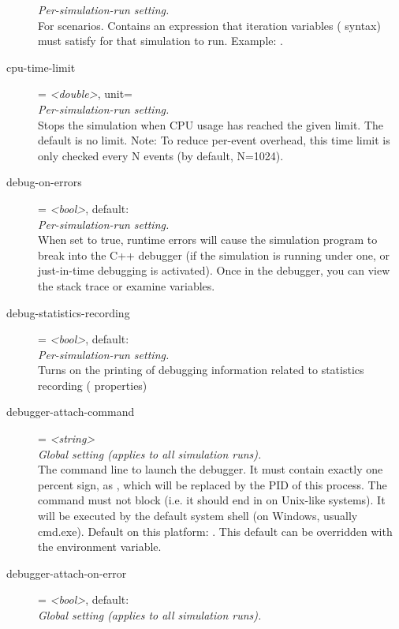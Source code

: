\begin{description}
    \textit{Per-simulation-run setting.}\\
    For scenarios. Contains an expression that iteration variables
    (\ttt{\$\{{\allowbreak}\}{\allowbreak}} syntax) must satisfy for that
    simulation to run. Example: .
\item[cpu-time-limit] = \textit{<double>}, unit=\\
    \textit{Per-simulation-run setting.}\\
    Stops the simulation when CPU usage has reached the given limit. The
    default is no limit. Note: To reduce per-event overhead, this time limit is
    only checked every N events (by default, N=1024).
\item[debug-on-errors] = \textit{<bool>}, default: \\
    \textit{Per-simulation-run setting.}\\
    When set to true, runtime errors will cause the simulation program to break
    into the C++ debugger (if the simulation is running under one, or
    just-in-time debugging is activated). Once in the debugger, you can view
    the stack trace or examine variables.
\item[debug-statistics-recording] = \textit{<bool>}, default: \\
    \textit{Per-simulation-run setting.}\\
    Turns on the printing of debugging information related to statistics
    recording ( properties)
\item[debugger-attach-command] = \textit{<string>}\\
    \textit{Global setting (applies to all simulation runs).}\\
    The command line to launch the debugger. It must contain exactly one
    percent sign, as , which will be replaced by the PID of this
    process. The command must not block (i.e. it should end in \ttt{\&} on
    Unix-like systems). It will be executed by the default system shell (on
    Windows, usually cmd.exe). Default on this platform: .
    This default can be overridden with the 
    environment variable.
\item[debugger-attach-on-error] = \textit{<bool>}, default: \\
    \textit{Global setting (applies to all simulation runs).}\\

\end{description}
